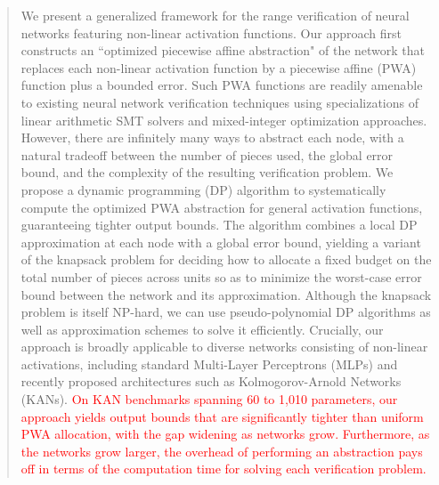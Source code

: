 \maketitle

\begin{abstract}
We present a generalized framework for the range verification of neural networks featuring non-linear activation functions. Our approach first constructs an ``optimized piecewise affine abstraction" of the network that replaces each non-linear activation function by a piecewise affine (PWA) function plus a bounded error. Such PWA functions are readily amenable to existing neural network verification techniques using specializations of linear arithmetic SMT solvers and mixed-integer optimization approaches. However, there are infinitely many ways to abstract each node, with a natural tradeoff between the number of pieces used, the global error bound, and the complexity of the resulting verification problem. We propose a dynamic programming (DP) algorithm to systematically compute the optimized PWA abstraction for general activation functions, guaranteeing tighter output bounds. The algorithm combines a local DP approximation at each node with a global error bound, yielding a variant of the knapsack problem for deciding how to allocate a fixed budget on the total number of pieces across units so as to minimize the worst-case error bound between the network and its approximation. Although the knapsack problem is itself NP-hard, we can use pseudo-polynomial DP algorithms as well as approximation schemes to solve it efficiently. Crucially, our approach is broadly applicable to diverse networks consisting of non-linear activations, including standard Multi-Layer Perceptrons (MLPs) and recently proposed architectures such as Kolmogorov-Arnold Networks (KANs). \textcolor{red}{On KAN benchmarks spanning 60 to 1,010 parameters, our approach yields output bounds that are significantly tighter than uniform PWA allocation, with the gap widening as networks grow. Furthermore, as the networks grow larger, the overhead of performing an abstraction pays off in terms of the computation time for solving each verification problem.}

\end{abstract}

\IEEEpeerreviewmaketitle
















\newpage
\onecolumn




